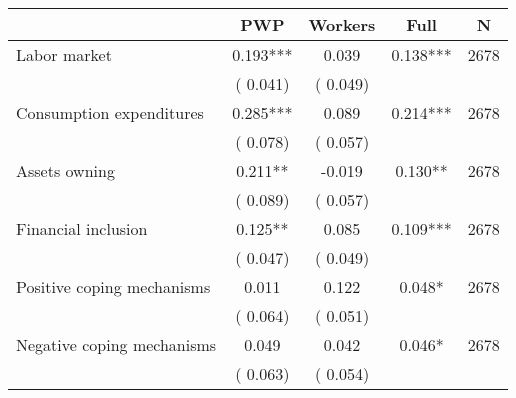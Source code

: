
\begin{tabular}{l*{4}{c}}\hline&\multicolumn{1}{c}{PWP}&\multicolumn{1}{c}{Workers}&\multicolumn{1}{c}{Full}&\multicolumn{1}{c}{N} \\ \hline

 Labor market &              0.193*** &         0.039 &           0.138*** & 2678                       \\  
                 &        (       0.041)                   &        (       0.049)                        &                                                             &                                                      \\      

 Consumption expenditures &              0.285*** &         0.089 &           0.214*** & 2678                       \\  
                 &        (       0.078)                   &        (       0.057)                        &                                                             &                                                      \\      

 Assets owning &              0.211** &        -0.019 &           0.130** & 2678                       \\  
                 &        (       0.089)                   &        (       0.057)                        &                                                             &                                                      \\      

 Financial inclusion &              0.125** &         0.085 &           0.109*** & 2678                       \\  
                 &        (       0.047)                   &        (       0.049)                        &                                                             &                                                      \\      

 Positive coping mechanisms &              0.011 &         0.122 &           0.048* & 2678                       \\  
                 &        (       0.064)                   &        (       0.051)                        &                                                             &                                                      \\      

 Negative coping mechanisms &              0.049 &         0.042 &           0.046* & 2678                       \\  
                 &        (       0.063)                   &        (       0.054)                        &                                                             &                                                      \\      


\end{tabular}
